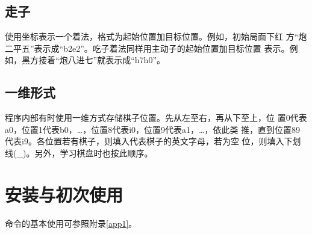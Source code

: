 \documentclass[a4paper]{article}
\begin{document}
\subsection{走子}
使用坐标表示一个着法，格式为起始位置加目标位置。例如，初始局面下红
方``炮二平五''表示成``b2e2''。吃子着法同样用主动子的起始位置加目标位置
表示。例如，黑方接着``炮八进七''就表示成``h7h0''。

\smallboard
\begin{position}
   
   
   
   
   
      

   
   
   
   
   
      
\end{position}
\smallboard
\begin{position}
   
   
   
   
   
      

   
   
   
   
      
\end{position}

\subsection{一维形式}
\label{onedim}
程序内部有时使用一维方式存储棋子位置。先从左至右，再从下至上，位
置0代表a0，位置1代表b0，\dots，位置8代表i0，位置9代表a1，\dots，依此类
推，直到位置89代表i9。各位置若有棋子，则填入代表棋子的英文字母，若为空
位，则填入下划线(\_)。另外，学习棋盘时也按此顺序。

\section{安装与初次使用}
命令的基本使用可参照附录\ref{app1}。
\end{document}
